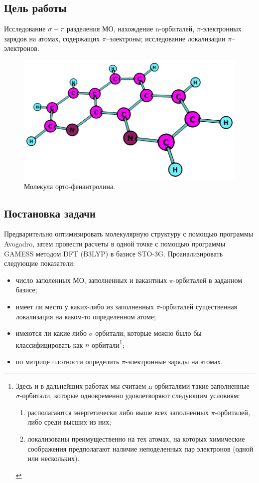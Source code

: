 \subsection{Цель работы}
Исследование $\sigma-\pi$ разделения МО, нахождение n-орбиталей, $\pi$-электронных зарядов на атомах, содержащих $\pi$–электроны; исследование локализации $\pi$–электронов.

\begin{figure}[H]
\centering
\captionsetup{justification=centering}
\includegraphics[scale=0.5]{fig/0.jpg}
\caption{Молекула орто-фенантролина.}
\end{figure}


\subsection{Постановка задачи}
Предварительно оптимизировать молекулярную структуру с помощью программы Avogadro, затем провести расчеты в одной точке с помощью программы GAMESS методом DFT (B3LYP) в базисе STO-3G. Проанализировать следующие показатели: 
\begin{itemize}
    \item число заполенных МО, заполненных и вакантных $\pi$-орбиталей в заданном базисе;
    \item имеет ли место у каких-либо из заполненных $\pi$-орбиталей существенная локализация на каком-то определенном атоме;
    \item имеются ли какие-либо $\sigma$-орбитали, которые можно было бы классифицировать как $n$-орбитали\footnote{Здесь и в дальнейших работах мы считаем n-орбиталями такие заполненные $\sigma$-орбитали, которые одновременно удовлетворяют следующим условиям:
\begin{enumerate}
    \item располагаются энергетически либо  выше всех заполненных $\pi$-орбиталей, либо среди высших из них; 
    \item локализованы преимущественно на тех атомах, на которых химические соображения предполагают наличие неподеленных пар электронов (одной или нескольких).
\end{enumerate}{}};
    \item по матрице плотности определить $\pi$-электронные заряды на атомах.
\end{itemize}


